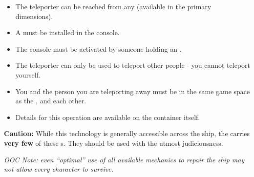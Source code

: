 \documentclass[green]{TMFHope}
\begin{document}
\begin{itemize}
  \item The teleporter can be reached from any \sConsole{} (available in the primary dimensions).
  \item A \iCrystal{\MYname{}} must be installed in the console.
	\item The console must be activated by someone holding an \iKey{\MYname{}}.
	\item The teleporter can only be used to teleport other people - you cannot teleport yourself.
	\item You and the person you are teleporting away must be in the same game space as the \sConsole{}, and each other.
	\item Details for this operation are available on the \sConsole{} container itself.
\end{itemize}
\textbf{Caution:} While this technology is generally accessible across the ship, the \pNew{} carries \textbf{very few} of these \iCrystal{\MYname{}}s. They should be used with the utmost judiciousness. 

\emph{OOC Note: even ``optimal'' use of all available mechanics to repair the ship may not allow every character to survive.}
\end{document}
